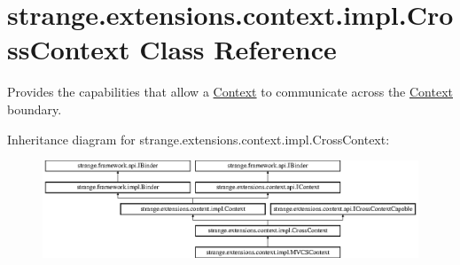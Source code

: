 \hypertarget{classstrange_1_1extensions_1_1context_1_1impl_1_1_cross_context}{\section{strange.\-extensions.\-context.\-impl.\-Cross\-Context Class Reference}
\label{classstrange_1_1extensions_1_1context_1_1impl_1_1_cross_context}
}


Provides the capabilities that allow a \hyperlink{classstrange_1_1extensions_1_1context_1_1impl_1_1_context}{Context} to communicate across the \hyperlink{classstrange_1_1extensions_1_1context_1_1impl_1_1_context}{Context} boundary.  


Inheritance diagram for strange.\-extensions.\-context.\-impl.\-Cross\-Context\-:\begin{figure}[H]
\begin{center}
\leavevmode
\includegraphics[height=2.925810cm]{classstrange_1_1extensions_1_1context_1_1impl_1_1_cross_context}
\end{center}
\end{figure}
